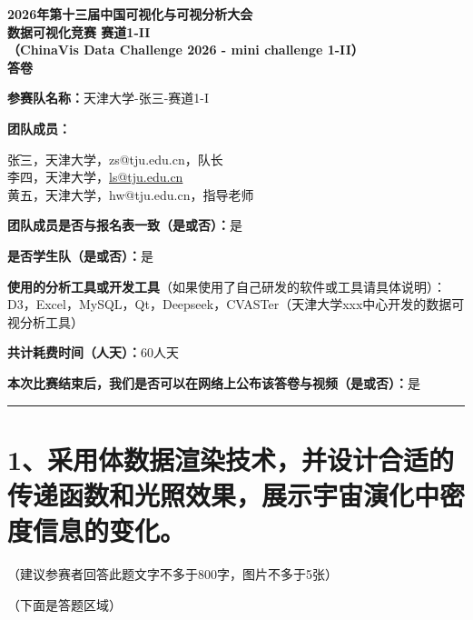 \documentclass[12pt, a4paper]{article}
\begin{document}
\begin{center}
    {\Large \textbf{2026年第十三届中国可视化与可视分析大会}}\\[0.5em]
    {\large \textbf{数据可视化竞赛 赛道1-II}}\\[0.3em]
    {\large \textbf{（ChinaVis Data Challenge 2026 - mini challenge 1-II）}}\\[1em]
    {\LARGE \textbf{答\quad 卷}}
\end{center}

\vspace{1em}
\noindent\textbf{参赛队名称：}天津大学-张三-赛道1-I

\vspace{0.5em}
\noindent\textbf{团队成员：}

\begin{tabbing}
    \hspace{4em} \= 张三，天津大学，zs@tju.edu.cn，队长 \\
    \> 李四，天津大学，\href{mailto:ls@tju.edu.cn}{ls@tju.edu.cn} \\
    \> 黄五，天津大学，hw@tju.edu.cn，指导老师
\end{tabbing}

\noindent\textbf{团队成员是否与报名表一致（是或否）：}是

\noindent\textbf{是否学生队（是或否）：}是

\noindent\textbf{使用的分析工具或开发工具}（如果使用了自己研发的软件或工具请具体说明）：\\
D3，Excel，MySQL，Qt，Deepseek，CVASTer（天津大学xxx中心开发的数据可视分析工具）

\noindent\textbf{共计耗费时间（人天）：}60人天

\noindent\textbf{本次比赛结束后，我们是否可以在网络上公布该答卷与视频（是或否）：}是

\vspace{1em}
\hrule
\vspace{1.5em}

\section*{1、采用体数据渲染技术，并设计合适的传递函数和光照效果，展示宇宙演化中密度信息的变化。}

{\small （建议参赛者回答此题文字不多于800字，图片不多于5张）}

\vspace{0.5em}
\noindent（下面是答题区域）
\end{document}
